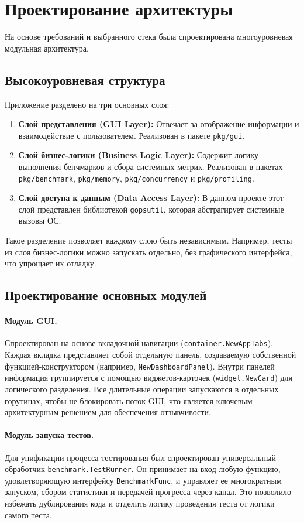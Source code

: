 \section{Проектирование архитектуры}

На основе требований и выбранного стека была спроектирована многоуровневая модульная архитектура.

\subsection{Высокоуровневая структура}

Приложение разделено на три основных слоя:
\begin{enumerate}
    \item \textbf{Слой представления (GUI Layer):} Отвечает за отображение информации и взаимодействие с пользователем. Реализован в пакете \texttt{pkg/gui}.
    \item \textbf{Слой бизнес-логики (Business Logic Layer):} Содержит логику выполнения бенчмарков и сбора системных метрик. Реализован в пакетах \texttt{pkg/benchmark}, \texttt{pkg/memory}, \texttt{pkg/concurrency} и \texttt{pkg/profiling}.
    \item \textbf{Слой доступа к данным (Data Access Layer):} В данном проекте этот слой представлен библиотекой \texttt{gopsutil}, которая абстрагирует системные вызовы ОС.
\end{enumerate}

Такое разделение позволяет каждому слою быть независимым. Например, тесты из слоя бизнес-логики можно запускать отдельно, без графического интерфейса, что упрощает их отладку.

\subsection{Проектирование основных модулей}

\paragraph{Модуль GUI.} Спроектирован на основе вкладочной навигации (\texttt{container.NewAppTabs}). Каждая вкладка представляет собой отдельную панель, создаваемую собственной функцией-конструктором (например, \texttt{NewDashboardPanel}). Внутри панелей информация группируется с помощью виджетов-карточек (\texttt{widget.NewCard}) для логического разделения. Все длительные операции запускаются в отдельных горутинах, чтобы не блокировать поток GUI, что является ключевым архитектурным решением для обеспечения отзывчивости.

\paragraph{Модуль запуска тестов.} Для унификации процесса тестирования был спроектирован универсальный обработчик \texttt{benchmark.TestRunner}. Он принимает на вход любую функцию, удовлетворяющую интерфейсу \texttt{BenchmarkFunc}, и управляет ее многократным запуском, сбором статистики и передачей прогресса через канал. Это позволило избежать дублирования кода и отделить логику проведения теста от логики самого теста.

